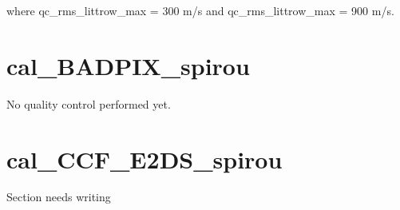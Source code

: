 \noindent where qc\_rms\_littrow\_max = 300 m/s and qc\_rms\_littrow\_max = 900 m/s.



\section{cal\_BADPIX\_spirou}
\label{section:qc_cal_BADPIX_spirou}


No quality control performed yet.


\section{cal\_CCF\_E2DS\_spirou}
\label{section:qc_cal_CCF_E2DS_spirou}


Section needs writing


